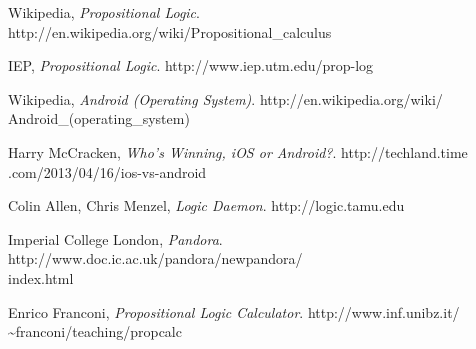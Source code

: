 \documentclass{report}
\begin{document}
\begin{thebibliography}{9}

  Wikipedia,
  \emph{Propositional Logic}.
  http://en.wikipedia.org/wiki/Propositional\_calculus

  IEP,
  \emph{Propositional Logic}.
  http://www.iep.utm.edu/prop-log

  Wikipedia,
  \emph{Android (Operating System)}.
  http://en.wikipedia.org/wiki/\\Android\_(operating\_system)

  Harry McCracken,
  \emph{Who’s Winning, iOS or Android?}.
  http://techland.time\\.com/2013/04/16/ios-vs-android

  Colin Allen, Chris Menzel,
  \emph{Logic Daemon}.
  http://logic.tamu.edu

  Imperial College London,
  \emph{Pandora}.
  http://www.doc.ic.ac.uk/pandora/newpandora/\\index.html

  Enrico Franconi,
  \emph{Propositional Logic Calculator}.
  http://www.inf.unibz.it/\\\textasciitilde franconi/teaching/propcalc

\end{thebibliography}
\end{document}
